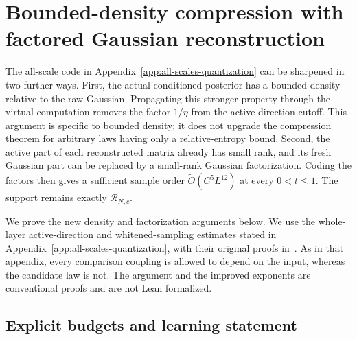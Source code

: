 \section{Bounded-density compression with factored Gaussian reconstruction}
\label{app:factor-code}

The all-scale code in Appendix~\ref{app:all-scales-quantization} can be
sharpened in two further ways. First, the actual conditioned posterior has
a bounded density relative to the raw Gaussian. Propagating this stronger
property through the virtual computation removes the factor $1/\eta$
from the active-direction cutoff. This argument is specific to bounded
density; it does not upgrade the compression theorem for arbitrary laws
having only a relative-entropy bound. Second, the active part of each
reconstructed matrix already has small rank, and its fresh Gaussian part
can be replaced by a small-rank Gaussian factorization. Coding the factors
then gives a sufficient sample order $\widetilde O(C^5L^{12})$ at every
$0<t\le1$. The support remains exactly $\mathcal R_{N,c}$.

We prove the new density and factorization arguments below. We use the
whole-layer active-direction and whitened-sampling estimates stated in
Appendix~\ref{app:all-scales-quantization}, with their original proofs
in~\cite{all-scales}. As in that appendix, every comparison coupling is
allowed to depend on the input, whereas the candidate law is not. The
argument and the improved exponents are conventional proofs and are not
Lean formalized.

\subsection{Explicit budgets and learning statement}

